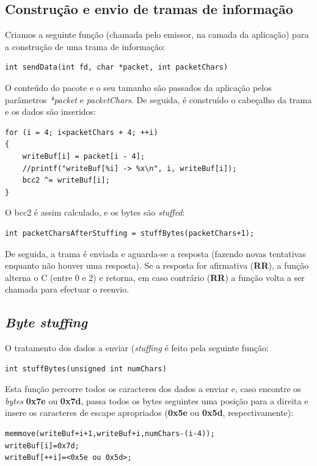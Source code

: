 \documentclass[a4paper,11pt]{article}
\begin{document}
\subsection{Construção e envio de tramas de informação}

Criamos a seguinte função (chamada pelo emissor, na camada da aplicação) para a construção de uma trama de informação:

\begin{lstlisting}
int sendData(int fd, char *packet, int packetChars)
\end{lstlisting}

O conteúdo do pacote e o seu tamanho são passados da aplicação pelos parâmetros \textit{*packet} e \textit{packetChars}.
De seguida, é construído o cabeçalho da trama e os dados são inseridos:
\begin{lstlisting}
for (i = 4; i<packetChars + 4; ++i)
{
    writeBuf[i] = packet[i - 4];
    //printf("writeBuf[%i] -> %x\n", i, writeBuf[i]);
    bcc2 ^= writeBuf[i];
}
\end{lstlisting}

O bcc2 é assim calculado, e os bytes são \textit{stuffed}:
\begin{lstlisting}
int packetCharsAfterStuffing = stuffBytes(packetChars+1);
\end{lstlisting}

De seguida, a trama é enviada e aguarda-se a resposta (fazendo novas tentativas enquanto não houver uma resposta).
Se a resposta for afirmativa (\textbf{RR}), a função alterna o C (entre 0 e 2) e retorna, em caso contrário (\textbf{RR}) a função volta a ser chamada para efectuar o reenvio.

\subsection{\textit{Byte stuffing}}
O tratamento dos dados a enviar (\textit{stuffing} é feito pela seguinte função:
\begin{lstlisting}
int stuffBytes(unsigned int numChars)
\end{lstlisting}

Esta função percorre todos os caracteres dos dados a enviar e, caso encontre os \textit{bytes} \textbf{0x7e} ou \textbf{0x7d}, passa todos os bytes seguintes uma posição para a direita e insere os caracteres de escape apropriados (\textbf{0x5e} ou \textbf{0x5d}, respectivamente):
\begin{lstlisting}
memmove(writeBuf+i+1,writeBuf+i,numChars-(i-4));
writeBuf[i]=0x7d;
writeBuf[++i]=<0x5e ou 0x5d>;
\end{lstlisting}
\end{document}

